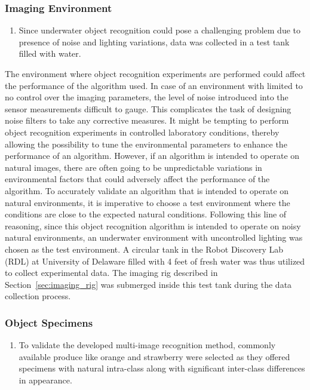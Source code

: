 \documentclass {udthesis}
\begin{document}
\subsubsection{Imaging Environment}


\begin{enumerate}
	\item Since underwater object recognition could pose a challenging problem due to presence of noise and lighting variations, data was collected in a test tank filled with water.
\end{enumerate}


The environment where object recognition experiments are performed could affect the performance of the algorithm used. In case of an environment with limited to no control over the imaging parameters, the level of noise introduced into the sensor measurements difficult to gauge. This complicates the task of designing noise filters to take any corrective measures. It might be tempting to perform object recognition experiments in controlled laboratory conditions, thereby allowing the possibility to tune the environmental parameters to enhance the performance of an algorithm. However, if an algorithm is intended to operate on natural images, there are often going to be unpredictable variations in environmental factors that could adversely affect the performance of the algorithm. To accurately validate an algorithm that is intended to operate on natural environments, it is imperative to choose a 
test environment where the conditions are close to the expected natural conditions. Following this line of reasoning, since this object recognition algorithm is intended to operate on noisy natural environments, an underwater environment with uncontrolled lighting was chosen as the test environment. A circular tank in the Robot Discovery Lab (RDL) at University of Delaware filled with 4 feet of fresh water was thus utilized to collect experimental data. The imaging rig described in Section~\ref{sec:imaging_rig} was submerged inside this test tank during the data collection process.

\subsubsection{Object Specimens}


\begin{enumerate}
	\item To validate the developed multi-image recognition method, commonly available produce like orange and strawberry were selected as they offered specimens with natural intra-class along with significant inter-class differences in appearance.
\end{enumerate}
\end{document}
